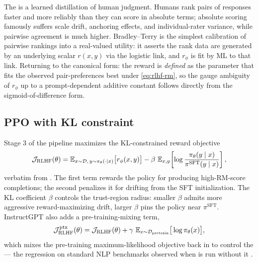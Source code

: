 \begin{intuition}
The  is a learned distillation of human judgment.
Humans rank pairs of responses faster and more reliably than they can
score in absolute terms; absolute scoring famously suffers scale drift,
anchoring effects, and individual-rater variance, while pairwise
agreement is much higher. Bradley--Terry is the simplest calibration
of pairwise rankings into a real-valued utility: it asserts the rank
data are generated by an underlying scalar $r(x, y)$ via the logistic
link, and $r_\phi$ is fit by ML to that link. Returning to the
canonical form: the reward is \emph{defined} as the parameter that
fits the observed pair-preferences best under
\cref{eq:rlhf-rm}, so the gauge ambiguity of $r_\phi$ up to a
prompt-dependent additive constant follows directly from the
sigmoid-of-difference form.
\end{intuition}

\subsection{PPO with KL constraint}
\label{sec:rlhf-ppo}

Stage 3 of the pipeline maximizes the KL-constrained reward objective
\begin{equation}
\mathcal{J}_{\mathrm{RLHF}}(\theta)
  = \operatorname{\mathbb{E}}_{x \sim \mathcal{D},\, y \sim \pi_\theta(\cdot \mid x)}\!\big[r_\phi(x, y)\big]
    - \beta \, \operatorname{\mathbb{E}}_{x, y}\!\left[\log \frac{\pi_\theta(y \mid x)}{\pi^{\mathrm{SFT}}(y \mid x)}\right],
\label{eq:rlhf-ppo}
\end{equation}
verbatim from \citet[\S 3]{ouyang2022-instructgpt}. The first term
rewards the policy for producing high-RM-score completions; the
second penalizes it for drifting from the SFT initialization. The KL
coefficient $\beta$ controls the trust-region radius: smaller $\beta$
admits more aggressive reward-maximizing drift, larger $\beta$ pins
the policy near $\pi^{\mathrm{SFT}}$. InstructGPT also adds a
 pre-training-mixing term,
\begin{equation}
\mathcal{J}_{\mathrm{RLHF}}^{\mathrm{ptx}}(\theta)
  = \mathcal{J}_{\mathrm{RLHF}}(\theta)
    + \gamma\, \operatorname{\mathbb{E}}_{x \sim \mathcal{D}_{\mathrm{pretrain}}}\!\big[\log \pi_\theta(x)\big],
\label{eq:rlhf-ptx}
\end{equation}
which mixes the pre-training maximum-likelihood objective back in to
control the \emph{} — the regression on standard NLP
benchmarks observed when  is run without it
\citep[\S 3]{ouyang2022-instructgpt}.

